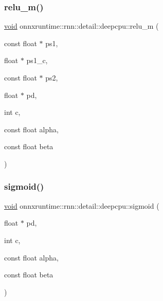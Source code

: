 \subsubsection{\texorpdfstring{relu\+\_\+m()}{relu\_m()}}
{\footnotesize\ttfamily \mbox{\hyperlink{mlasi_8h_a88f941d423cb2a819b70a1358982b1a6}{void}} onnxruntime\+::rnn\+::detail\+::deepcpu\+::relu\+\_\+m (\begin{DoxyParamCaption}\item[{const float $\ast$}]{ps1,  }\item[{float $\ast$}]{ps1\+\_\+c,  }\item[{const float $\ast$}]{ps2,  }\item[{float $\ast$}]{pd,  }\item[{int}]{c,  }\item[{const float}]{alpha,  }\item[{const float}]{beta }\end{DoxyParamCaption})}

\mbox{\label{namespaceonnxruntime_1_1rnn_1_1detail_1_1deepcpu_ab977a8d517ba2f63e0c831bc548e8c11}} 
\subsubsection{\texorpdfstring{sigmoid()}{sigmoid()}}
{\footnotesize\ttfamily \mbox{\hyperlink{mlasi_8h_a88f941d423cb2a819b70a1358982b1a6}{void}} onnxruntime\+::rnn\+::detail\+::deepcpu\+::sigmoid (\begin{DoxyParamCaption}\item[{float $\ast$}]{pd,  }\item[{int}]{c,  }\item[{const float}]{alpha,  }\item[{const float}]{beta }\end{DoxyParamCaption})}

\mbox{\label{namespaceonnxruntime_1_1rnn_1_1detail_1_1deepcpu_af7a1c48db5b0ac20916af44b02931ab8}} 

